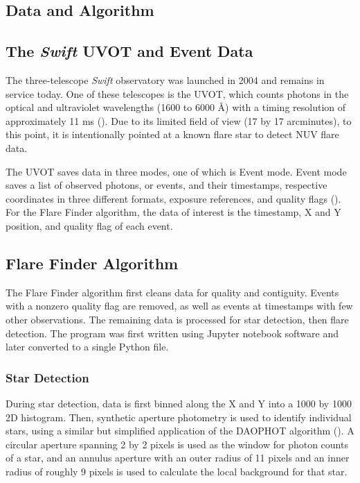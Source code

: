 \documentclass{article}
\begin{document}
\begin{multicols}{2}
\section{Data and Algorithm}

\subsection{The \textit{Swift} UVOT and Event Data}

The three-telescope \textit{Swift} observatory was launched in 2004 and remains in service today. One of these telescopes is the UVOT, which counts photons in the optical and ultraviolet wavelengths (1600 to 6000 {\AA}) with a timing resolution of approximately 11 ms (\cite{nasaSwiftUVOT}). Due to its limited field of view (17 by 17 arcminutes), to this point, it is intentionally pointed at a known flare star to detect NUV flare data. 

The UVOT saves data in three modes, one of which is Event mode. Event mode saves a list of observed photons, or events, and their timestamps, respective coordinates in three different formats, exposure references, and quality flags (\cite{swiftGuide}). For the Flare Finder algorithm, the data of interest is the timestamp, X and Y position, and quality flag of each event. 

\subsection{Flare Finder Algorithm}

The Flare Finder algorithm first cleans data for quality and contiguity. Events with a nonzero quality flag are removed, as well as events at timestamps with few other observations. The remaining data is processed for star detection, then flare detection. The program was first written using Jupyter notebook software and later converted to a single Python file.

\subsubsection{Star Detection} \label{sss:starDetect}

During star detection, data is first binned along the X and Y into a 1000 by 1000 2D histogram. Then, synthetic aperture photometry is used to identify individual stars, using a similar but simplified application of the DAOPHOT algorithm (\cite{stetson}). A circular aperture spanning 2 by 2 pixels is used as the window for photon counts of a star, and an annulus aperture with an outer radius of 11 pixels and an inner radius of roughly 9 pixels is used to calculate the local background for that star. 


\end{multicols}
\end{document}
